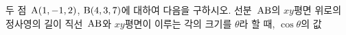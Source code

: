 두 점~$\mathrm{A}(1{,}\mkern3mu\mathopen{}-1{,}\mkern3mu\mathopen{}2)$, $\mathrm{B}(4{,}\mkern3mu\mathopen{}3{,}\mkern3mu\mathopen{}7)$에 대하여 다음을 구하시오.
 선분~$\mathrm{AB}$의 $xy$평면 위로의 정사영의 길이
 직선~$\mathrm{AB}$와 $xy$평면이 이루는 각의 크기를 $\theta$라 할 때, $\cos\theta$의 값
